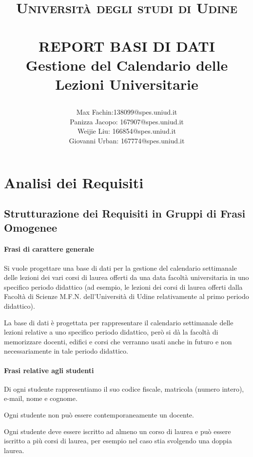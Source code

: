 \documentclass[a4paper,11pt]{article}
\title{
    \normalfont \normalsize 

    \textsc{Università degli studi di Udine} \\ [25pt]
    \horrule{0.5pt} \\[0.5cm]
    \huge REPORT BASI DI DATI \\[0.5cm]
    \large Gestione del Calendario delle Lezioni Universitarie
    \horrule{0.5pt} \\[0.5cm]
}
\begin{document}
\author{Max Fachin:138099@spes.uniud.it\\ 
Panizza Jacopo: 167907@spes.uniud.it\\ 
Weijie Liu: 166854@spes.uniud.it\\ 
Giovanni Urban: 167774@spes.uniud.it}

\maketitle
\tableofcontents
\newpage

\section{Analisi dei Requisiti}
\subsection{Strutturazione dei Requisiti in Gruppi di Frasi Omogenee}


\paragraph{Frasi di carattere generale}

Si vuole progettare una base di dati per la gestione del calendario settimanale delle lezioni dei vari corsi di laurea offerti da una data facoltà universitaria in uno specifico periodo didattico (ad esempio, le lezioni dei corsi di laurea offerti dalla Facoltà di Scienze M.F.N. dell'Università di Udine relativamente al primo periodo didattico).

La base di dati è progettata per rappresentare il calendario settimanale delle lezioni relative a uno specifico periodo didattico, però si dà la facoltà di memorizzare docenti, edifici e corsi che verranno usati anche in futuro e non necessariamente in tale periodo didattico.


\paragraph{Frasi relative agli studenti}

Di ogni studente rappresentiamo il suo codice fiscale, matricola (numero intero), e-mail, nome e cognome.

Ogni studente non può essere contemporaneamente un docente.

Ogni studente deve essere iscritto ad almeno un corso di laurea e può essere iscritto a più corsi di laurea, per esempio nel caso stia svolgendo una doppia laurea.
\end{document}
